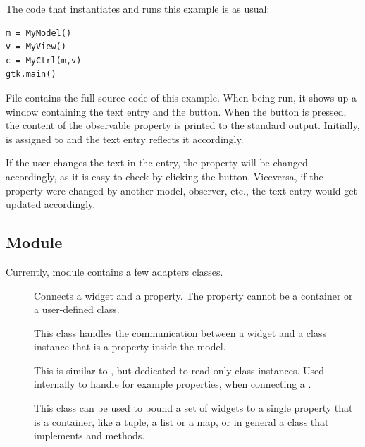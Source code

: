 The code that instantiates and runs this example is as usual:
{ \codesize
\begin{verbatim}
m = MyModel()
v = MyView()
c = MyCtrl(m,v)
gtk.main()
\end{verbatim}
}

File  contains the full source
code of this example. When being run, it shows up a window
containing the text entry and the button. When the button is
pressed, the content of the observable property  is
printed to the standard output. Initially,  is
assigned to  and the text entry reflects it
accordingly.

If the user changes the text in the entry, the property
 will be changed accordingly, as it is easy to check
by clicking the button. Viceversa, if the property 
were changed by another model, observer, etc., the text entry would
get updated accordingly.


\subsection{Module }
Currently, module  contains a few adapters
classes.

\begin{description}
\item [] Connects a widget and a property. The
  property cannot be a container or a user-defined class.

\item [] This class handles the
  communication between a widget and a class instance that is a
  property inside the model.

\item [] This is similar to
  , but dedicated to read-only class
  instances. Used internally to handle for example
   properties, when connecting a
  .

\item [] This class can be used to
  bound a set of widgets to a single property that is a container,
  like a tuple, a list or a map, or in general a class that
  implements  and
   methods.
\end{description}


